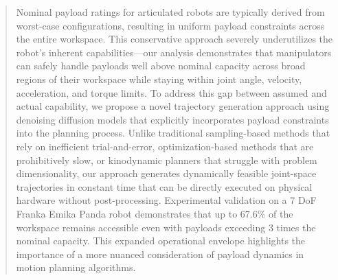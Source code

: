 \begin{abstract}
Nominal payload ratings for articulated robots are typically derived from worst-case configurations, resulting in uniform payload constraints across the entire workspace. This conservative approach severely underutilizes the robot's inherent capabilities---our analysis demonstrates that manipulators can safely handle payloads well above nominal capacity across broad regions of their workspace while staying within joint angle, velocity, acceleration, and torque limits. To address this gap between assumed and actual capability, we propose a novel trajectory generation approach using denoising diffusion models that explicitly incorporates payload constraints into the planning process. Unlike traditional sampling-based methods that rely on inefficient trial-and-error, optimization-based methods that are prohibitively slow, or kinodynamic planners that struggle with problem dimensionality, our approach generates dynamically feasible joint-space trajectories in constant time that can be directly executed on physical hardware without post-processing. Experimental validation on a 7 DoF Franka Emika Panda robot demonstrates that up to $67.6\%$ of the workspace remains accessible even with payloads exceeding $3$ times the nominal capacity. This expanded operational envelope highlights the importance of a more nuanced consideration of payload dynamics in motion planning algorithms.
\end{abstract}